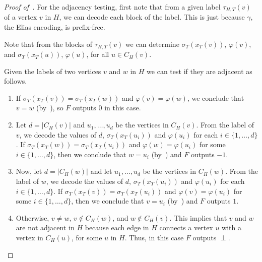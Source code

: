 \documentclass[kpfonts]{patmorin}
\newcommand{\Oh}{\mathcal{O}}
\begin{document}
\begin{proof}[Proof of~]
For the adjacency testing, first note that from a given label $\tau_{H,T}(v)$ of a vertex $v$ in $H$, we can decode each block of the label. 
This is just because $\gamma$, the Elias encoding, is prefix-free. 

Note that from the blocks of $\tau_{H,T}(v)$ we can determine $\sigma_T(x_T(v))$, $\varphi(v)$, and 
$\sigma_T(x_T(u))$, $\varphi(u)$, for all $u\in C_H(v)$.

Given the labels of two vertices $v$ and $w$ in $H$ we can test if they are adjacent as follows.
\begin{enumerate}
  \item If $\sigma_T(x_T(v)) = \sigma_T(x_T(w))$ and $\varphi(v)=\varphi(w)$, we conclude that $v=w$ (by~), so $F$ outputs $0$ in this case.

  \item Let $d=|C_H(v)|$ and $u_1,\dots, u_{d}$ be the vertices in $C_H(v)$. 
  From the label of $v$, 
  we decode the values of $d$, $\sigma_T(x_T(u_i))$ and $\varphi(u_i)$ for each $i\in\{1,\dots,d\}$.
  If $\sigma_T(x_T(w)) = \sigma_T(x_T(u_i))$ and $\varphi(w)=\varphi(u_i)$ for some $i\in\{1,\dots,d\}$, then we conclude that $w=u_i$ (by~) and $F$ outputs $-1$.

  \item  Now, let $d=|C_H(w)|$ and let $u_1,\dots, u_{d}$ be the vertices in $C_H(w)$. 
  From the label of $w$, 
  we decode the values of $d$, $\sigma_T(x_T(u_i))$ and $\varphi(u_i)$ for each $i\in\{1,\dots,d\}$.
  If $\sigma_T(x_T(v)) = \sigma_T(x_T(u_i))$ and $\varphi(v)=\varphi(u_i)$ for some $i\in\{1,\dots,d\}$, then we conclude that $v=u_i$ (by~) and $F$ outputs $1$.

  \item Otherwise, $v\neq w$, $v\not\in C_{H}(w)$, and $w\not\in C_{H}(v)$. 
  This implies that $v$ and $w$ are not adjacent in $H$ because each edge in $H$ connects a vertex $u$ with a vertex in $C_H(u)$, for some $u$ in $H$.
  Thus, in this case $F$ outputs $\perp$.
\end{enumerate}
\end{proof}

\end{document}
